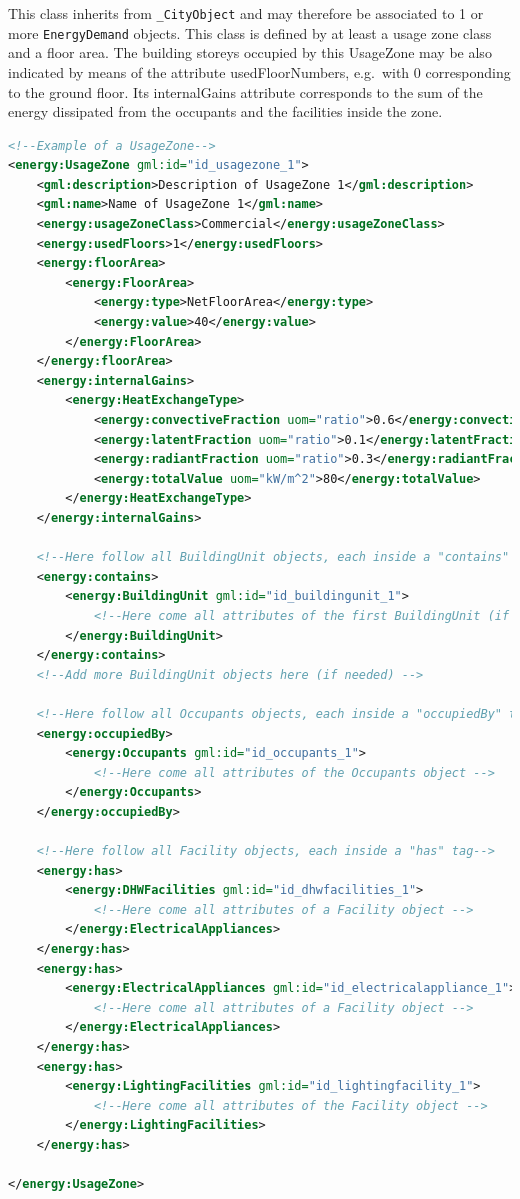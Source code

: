 \documentclass[a4paper,12pt]{article}
\begin{document}
This class inherits from \lstinline!_CityObject! and may therefore be
associated to 1 or more \lstinline!EnergyDemand! objects. This class is
defined by at least a usage zone class and a floor area. The building
storeys occupied by this UsageZone may be also indicated by means of the
attribute usedFloorNumbers, e.g.~with 0 corresponding to the ground
floor. Its internalGains attribute corresponds to the sum of the energy
dissipated from the occupants and the facilities inside the zone.

\begin{lstlisting}[language=XML]
<!--Example of a UsageZone-->
<energy:UsageZone gml:id="id_usagezone_1">
    <gml:description>Description of UsageZone 1</gml:description>
    <gml:name>Name of UsageZone 1</gml:name>
    <energy:usageZoneClass>Commercial</energy:usageZoneClass>
    <energy:usedFloors>1</energy:usedFloors>
    <energy:floorArea>
        <energy:FloorArea>
            <energy:type>NetFloorArea</energy:type>
            <energy:value>40</energy:value>
        </energy:FloorArea>
    </energy:floorArea>
    <energy:internalGains>
        <energy:HeatExchangeType>
            <energy:convectiveFraction uom="ratio">0.6</energy:convectiveFraction>
            <energy:latentFraction uom="ratio">0.1</energy:latentFraction>
            <energy:radiantFraction uom="ratio">0.3</energy:radiantFraction>
            <energy:totalValue uom="kW/m^2">80</energy:totalValue>
        </energy:HeatExchangeType>
    </energy:internalGains>

    <!--Here follow all BuildingUnit objects, each inside a "contains" tag-->
    <energy:contains>
        <energy:BuildingUnit gml:id="id_buildingunit_1">
            <!--Here come all attributes of the first BuildingUnit (if needed) -->
        </energy:BuildingUnit>
    </energy:contains>
    <!--Add more BuildingUnit objects here (if needed) -->

    <!--Here follow all Occupants objects, each inside a "occupiedBy" tag-->
    <energy:occupiedBy>
        <energy:Occupants gml:id="id_occupants_1">
            <!--Here come all attributes of the Occupants object -->
        </energy:Occupants>
    </energy:occupiedBy>

    <!--Here follow all Facility objects, each inside a "has" tag-->
    <energy:has>
        <energy:DHWFacilities gml:id="id_dhwfacilities_1">
            <!--Here come all attributes of a Facility object -->
        </energy:ElectricalAppliances>
    </energy:has>
    <energy:has>
        <energy:ElectricalAppliances gml:id="id_electricalappliance_1">
            <!--Here come all attributes of a Facility object -->
        </energy:ElectricalAppliances>
    </energy:has>
    <energy:has>
        <energy:LightingFacilities gml:id="id_lightingfacility_1">
            <!--Here come all attributes of the Facility object -->
        </energy:LightingFacilities>
    </energy:has>

</energy:UsageZone>
\end{lstlisting}
\end{document}
